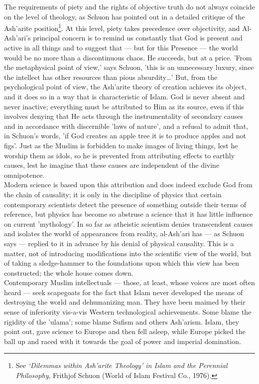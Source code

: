 \documentclass[10pt, twoside]{book}
\begin{document}
The requirements of piety and the rights of objective truth do not always coincide on the level of 
theology, as Schuon has pointed out in a detailed critique of the Ash'arite position\footnote{See \emph{`Dilemmas within Ash'arite Theology' in Islam and the Perennial Philosophy}, Frithjof Schuon 
(World of Islam Festival Co., 1976).}. At this 
level, piety takes precedence over objectivity, and Al\hyp{}Ash'ari's principal concern is to remind us 
constantly that God is present and active in all things and to suggest that --- but for this Presence --- 
the world would be no more than a discontinuous chaos. He succeeds, but at a price. 'From the 
metaphysical point of view,' says Schuon, 'this is an unnecessary luxury, since the intellect has 
other resources than pious absurdity\ldots{}' But, from the psychological point of view, the Ash'arite 
theory of creation achieves its object, and it does so in a way that is characteristic of Islam. God 
is never absent and never inactive; everything must be attributed to Him as its source, even if this 
involves denying that He acts through the instrumentality of secondary causes and in accordance with 
discernible 'laws of nature', and a refusal to admit that, in Schuon's words, 'if God creates an 
apple tree it is to produce apples and not figs'. Just as the Muslim is forbidden to make images of 
living things, lest he worship them as idols, so he is prevented from attributing effects to earthly 
causes, lest he imagine that these causes are independent of the divine omnipotence. \\

Modern science is based upon this attribution and does indeed exclude God from the chain of 
causality; it is only in the discipline of physics that certain contemporary scientists detect the 
presence of something outside their terms of reference, but physics has become so abstruse a science 
that it has little influence on current 'mythology'. In so far as atheistic scientism denies 
transcendent causes and isolates the world of appearances from reality, al-Ash'ari has --- as Schuon 
says --- replied to it in advance by his denial of physical causality. This is a matter, not of 
introducing modifications into the scientific view of the world, but of taking a sledge\hyp{}hammer to the 
foundations upon which this view has been constructed; the whole house comes down. \\

Contemporary Muslim intellectuals --- those, at least, whose voices are most often heard --- seek 
scapegoats for the fact that Islam never developed the means of destroying the world and dehumanizing 
man. They have been maimed by their sense of inferiority vis\hyp{}a\hyp{}vis Western technological 
achievements. Some blame the rigidity of the 'ulama'; some blame Sufism and others Ash'arism. Islam, 
they point out, gave science to Europe and then fell asleep, while Europe picked the ball up and 
raced with it towards the goal of power and imperial domination. \\
\end{document}
